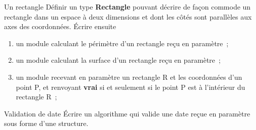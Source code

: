 		
		\begin{Exercice}{Un rectangle}
			Définir un type \textbf{Rectangle} pouvant décrire de façon
			commode un rectangle dans un espace à deux dimensions et dont les côtés
			sont parallèles aux axes des coordonnées. 	
			Écrire ensuite
		
			\begin{enumerate}[label=\alph*)]
			\item {
				un module calculant le périmètre d’un rectangle reçu en paramètre~;}
			\item {
				un module calculant la surface d’un rectangle reçu en paramètre~;}
			\item {
				un module recevant en paramètre un rectangle R et les coordonnées
				d’un point P, et renvoyant 
				\textbf{vrai} si et seulement si le point P est à
				l’intérieur du rectangle R~;}
			\end{enumerate}
		\end{Exercice}
		
		\begin{Exercice}{Validation de date}
			Écrire un algorithme qui valide une date reçue en paramètre 
			sous forme d’une structure.
		\end{Exercice}

	
